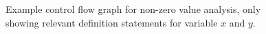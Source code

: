 \begin{figure}[h]
\begin{center}
\hfill
{}
\caption{Example control flow graph for
  non-zero value analysis, only showing relevant definition statements for
  variable $x$ and $y$.}
\label{fig:part1-vanilla-cfgexample}
\end{center}
\end{figure}


